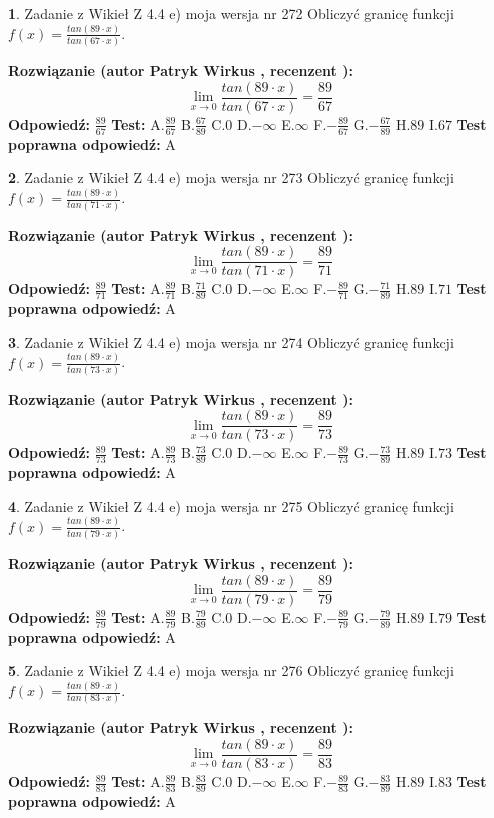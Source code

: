 \documentclass[12pt, a4paper]{article}
\theoremstyle{definition} %
\newtheorem{zad}{}
\newcommand{\zadStart}[1]{\begin{zad}#1\newline}
\newcommand{\zadStop}{\end{zad}}
\newcommand{\rozwStart}[2]{\noindent \textbf{Rozwiązanie (autor #1 , recenzent #2): }\newline}
\newcommand{\rozwStop}{\newline}
\newcommand{\odpStart}{\noindent \textbf{Odpowiedź:}\newline}
\newcommand{\odpStop}{\newline}
\newcommand{\testStart}{\noindent \textbf{Test:}\newline}
\newcommand{\testStop}{\newline}
\newcommand{\kluczStart}{\noindent \textbf{Test poprawna odpowiedź:}\newline}
\newcommand{\kluczStop}{\newline}
\begin{document}
\zadStart{Zadanie z Wikieł Z 4.4 e) moja wersja nr 272}
Obliczyć granicę funkcji $f(x)=\frac{tan(89\cdot x)}{tan(67\cdot x)}$.
\zadStop
\rozwStart{Patryk Wirkus}{}
$$\lim\limits_{x\to 0}\frac{tan(89\cdot x)}{tan(67\cdot x)}=
\frac{89}{67}$$
\rozwStop
\odpStart
$\frac{89}{67}$
\odpStop
\testStart
A.$\frac{89}{67}$
B.$\frac{67}{89}$
C.$0$
D.$-\infty$
E.$\infty$
F.$-\frac{89}{67}$
G.$-\frac{67}{89}$
H.$89$
I.$67$
\testStop
\kluczStart
A
\kluczStop



\zadStart{Zadanie z Wikieł Z 4.4 e) moja wersja nr 273}
Obliczyć granicę funkcji $f(x)=\frac{tan(89\cdot x)}{tan(71\cdot x)}$.
\zadStop
\rozwStart{Patryk Wirkus}{}
$$\lim\limits_{x\to 0}\frac{tan(89\cdot x)}{tan(71\cdot x)}=
\frac{89}{71}$$
\rozwStop
\odpStart
$\frac{89}{71}$
\odpStop
\testStart
A.$\frac{89}{71}$
B.$\frac{71}{89}$
C.$0$
D.$-\infty$
E.$\infty$
F.$-\frac{89}{71}$
G.$-\frac{71}{89}$
H.$89$
I.$71$
\testStop
\kluczStart
A
\kluczStop



\zadStart{Zadanie z Wikieł Z 4.4 e) moja wersja nr 274}
Obliczyć granicę funkcji $f(x)=\frac{tan(89\cdot x)}{tan(73\cdot x)}$.
\zadStop
\rozwStart{Patryk Wirkus}{}
$$\lim\limits_{x\to 0}\frac{tan(89\cdot x)}{tan(73\cdot x)}=
\frac{89}{73}$$
\rozwStop
\odpStart
$\frac{89}{73}$
\odpStop
\testStart
A.$\frac{89}{73}$
B.$\frac{73}{89}$
C.$0$
D.$-\infty$
E.$\infty$
F.$-\frac{89}{73}$
G.$-\frac{73}{89}$
H.$89$
I.$73$
\testStop
\kluczStart
A
\kluczStop



\zadStart{Zadanie z Wikieł Z 4.4 e) moja wersja nr 275}
Obliczyć granicę funkcji $f(x)=\frac{tan(89\cdot x)}{tan(79\cdot x)}$.
\zadStop
\rozwStart{Patryk Wirkus}{}
$$\lim\limits_{x\to 0}\frac{tan(89\cdot x)}{tan(79\cdot x)}=
\frac{89}{79}$$
\rozwStop
\odpStart
$\frac{89}{79}$
\odpStop
\testStart
A.$\frac{89}{79}$
B.$\frac{79}{89}$
C.$0$
D.$-\infty$
E.$\infty$
F.$-\frac{89}{79}$
G.$-\frac{79}{89}$
H.$89$
I.$79$
\testStop
\kluczStart
A
\kluczStop



\zadStart{Zadanie z Wikieł Z 4.4 e) moja wersja nr 276}
Obliczyć granicę funkcji $f(x)=\frac{tan(89\cdot x)}{tan(83\cdot x)}$.
\zadStop
\rozwStart{Patryk Wirkus}{}
$$\lim\limits_{x\to 0}\frac{tan(89\cdot x)}{tan(83\cdot x)}=
\frac{89}{83}$$
\rozwStop
\odpStart
$\frac{89}{83}$
\odpStop
\testStart
A.$\frac{89}{83}$
B.$\frac{83}{89}$
C.$0$
D.$-\infty$
E.$\infty$
F.$-\frac{89}{83}$
G.$-\frac{83}{89}$
H.$89$
I.$83$
\testStop
\kluczStart
A
\kluczStop
\end{document}
